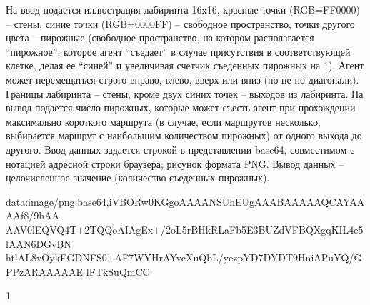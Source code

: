 
На ввод подается иллюстрация лабиринта 16x16, красные точки \linebreak (RGB=FF0000) – стены, синие точки (RGB=0000FF) – свободное пространство, точки другого цвета – пирожные (свободное пространство, на котором располагается “пирожное”, которое агент “съедает” в случае присутствия в соответствующей клетке, делая ее “синей” и увеличивая счетчик съеденных пирожных на 1). Агент может перемещаться строго вправо, влево, вверх или вниз (но не по диагонали). Границы лабиринта – стены, кроме двух синих точек – выходов из лабиринта. На вывод подается число пирожных, которые может съесть агент при прохождении максимально короткого маршрута (в случае, если маршрутов несколько, выбирается маршрут с наибольшим количеством пирожных) от одного выхода до другого. Ввод данных задается строкой в представлении base64, совместимом с нотацией адресной строки браузера; рисунок формата PNG. Вывод данных – целочисленное значение (количество съеденных пирожных).

\begin{myverbbox}[\small]{\vinput}
    data:image/png;base64,iVBORw0KGgoAAAANSUhEUgAAABAAAAAQCAYAAAAf8/9hAA
    AAV0lEQVQ4T+2TQQoAIAgEx+/2oL5rBHkRLaFb5E3BUZdVFBQXgqKIL4e5lAAN6DGvBN
    htlAL8vOykEGDNFS0+AF7WYHrAYvcXuQbL/yczpYD7DYDT9HniAPuYQ/GPPzARAAAAAE
    lFTkSuQmCC
\end{myverbbox}
\begin{myverbbox}[\small]{\voutput}
    1
\end{myverbbox}

